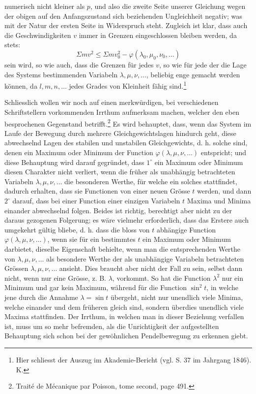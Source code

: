 \documentclass[11pt]{article}
\begin{document}
\noindent numerisch nicht kleiner als $p$, und also die zweite Seite unserer Gleichung wegen der obigen auf den Anfangszustand sich beziehenden Ungleichheit negativ; was mit der Natur der ersten Seite in Widerspruch steht. Zugleich ist klar, dass auch die Geschwindigkeiten $v$ immer in Grenzen eingeschlossen bleiben werden, da stets:
\[
\Sigma m v^2 \leq \Sigma m v_0^2-\varphi(\lambda_0,\mu_0,\nu_0,\ldots)
\]
sein wird, so wie auch, dass die Grenzen für jedes $v$, so wie für jede der die Lage des Systems bestimmenden Variabeln $\lambda,\mu,\nu,\ldots$, beliebig enge gemacht werden können, da $l,m,n,\ldots$ jedes Grades von Kleinheit fähig sind.\footnote{Hier schliesst der Auszug im Akademie-Bericht (vgl. S. 37 im Jahrgang 1846). K.}

Schliesslich wollen wir noch auf einen merkwürdigen, bei verschiedenen Schriftstellern vorkommenden Irrthum aufmerksam machen, welcher den eben besprochenen Gegenstand betrifft.\footnote{Traité de Mécanique par Poisson, tome second, page 491.} Es wird behauptet, dass, wenn das System im Laufe der Bewegung durch mehrere Gleichgewichtslagen hindurch geht, diese abwechselnd Lagen des stabilen und unstabilen Gleichgewichts, d. h. solche sind, denen ein Maximum oder Minimum der Function $\varphi(\lambda,\mu,\nu,\ldots)$ entspricht; und diese Behauptung wird darauf gegründet, dass $1^\circ$ ein Maximum oder Minimum diesen Charakter nicht verliert, wenn die früher als unabhängig betrachteten Variabeln $\lambda,\mu,\nu,\ldots$ die besonderen Werthe, für welche ein solches stattfindet, dadurch erhalten, dass sie Functionen von einer neuen Grösse $t$ werden, und dann $2^\circ$ darauf, dass bei einer Function einer einzigen Variabeln $t$ Maxima und Minima einander abwechselnd folgen. Beides ist richtig, berechtigt aber nicht zu der daraus gezogenen Folgerung; es wäre vielmehr erforderlich, dass das Erstere auch umgekehrt gültig bliebe, d. h. dass die bloss von $t$ abhängige Function $\varphi(\lambda,\mu,\nu,\ldots)$, wenn sie für ein bestimmtes $t$ ein Maximum oder Minimum darbietet, dieselbe Eigenschaft behielte, wenn man die entsprechenden Werthe von $\lambda,\mu,\nu,\ldots$ als besondere Werthe der als unabhängige Variabeln betrachteten Grössen $\lambda,\mu,\nu,\ldots$ ansieht. Dies braucht aber nicht der Fall zu sein, selbst dann nicht, wenn nur eine Grösse, z. B. $\lambda$, vorkommt. So hat die Function $\lambda^2$ nur ein Minimum und gar kein Maximum, während für die Function $\sin^2 t$, in welche jene durch die Annahme $\lambda=\sin t$ übergeht, nicht nur unendlich viele Minima, welche einander und dem früheren gleich sind, sondern überdies unendlich viele Maxima stattfinden. Der Irrthum, in welchen man in dieser Beziehung verfallen ist, muss um so mehr befremden, als die Unrichtigkeit der aufgestellten Behauptung sich schon bei der gewöhnlichen Pendelbewegung zu erkennen giebt.
\end{document}
